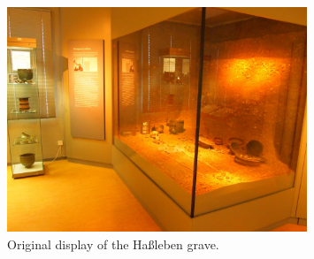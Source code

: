 \begin{figure}[i]
	\centering
	\includegraphics[width=0.8\textwidth]{../pics/Original.png}
	\caption{Original display of the Haßleben grave.}
	\label{fig:museums_original}
\end{figure}

